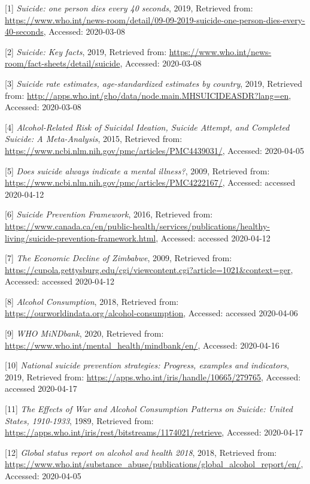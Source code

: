 \documentclass[]{article}
\begin{document}
{[}1{]} \emph{Suicide: one person dies every 40 seconds}, 2019,
Retrieved from:
\url{https://www.who.int/news-room/detail/09-09-2019-suicide-one-person-dies-every-40-seconds},
Accessed: 2020-03-08

{[}2{]} \emph{Suicide: Key facts}, 2019, Retrieved from:
\url{https://www.who.int/news-room/fact-sheets/detail/suicide},
Accessed: 2020-03-08

{[}3{]} \emph{Suicide rate estimates, age-standardized estimates by
country}, 2019, Retrieved from:
\url{http://apps.who.int/gho/data/node.main.MHSUICIDEASDR?lang=en},
Accessed: 2020-03-08

{[}4{]} \emph{Alcohol-Related Risk of Suicidal Ideation, Suicide
Attempt, and Completed Suicide: A Meta-Analysis}, 2015, Retrieved from:
\url{https://www.ncbi.nlm.nih.gov/pmc/articles/PMC4439031/}, Accessed:
2020-04-05

{[}5{]} \emph{Does suicide always indicate a mental illness?}, 2009,
Retrieved from:
\url{https://www.ncbi.nlm.nih.gov/pmc/articles/PMC4222167/}, Accessed:
accessed 2020-04-12

{[}6{]} \emph{Suicide Prevention Framework}, 2016, Retrieved from:
\url{https://www.canada.ca/en/public-health/services/publications/healthy-living/suicide-prevention-framework.html},
Accessed: accessed 2020-04-12

{[}7{]} \emph{The Economic Decline of Zimbabwe}, 2009, Retrieved from:
\url{https://cupola.gettysburg.edu/cgi/viewcontent.cgi?article=1021\&context=ger},
Accessed: accessed 2020-04-12

{[}8{]} \emph{Alcohol Consumption}, 2018, Retrieved from:
\url{https://ourworldindata.org/alcohol-consumption}, Accessed: accessed
2020-04-06

{[}9{]} \emph{WHO MiNDbank}, 2020, Retrieved from:
\url{https://www.who.int/mental_health/mindbank/en/}, Accessed:
2020-04-16

{[}10{]} \emph{National suicide prevention strategies: Progress,
examples and indicators}, 2019, Retrieved from:
\url{https://apps.who.int/iris/handle/10665/279765}, Accessed: accessed
2020-04-17

{[}11{]} \emph{The Effects of War and Alcohol Consumption Patterns on
Suicide: United States, 1910-1933}, 1989, Retrieved from:
\url{https://apps.who.int/iris/rest/bitstreams/1174021/retrieve},
Accessed: 2020-04-17

{[}12{]} \emph{Global status report on alcohol and health 2018}, 2018,
Retrieved from:
\url{https://www.who.int/substance_abuse/publications/global_alcohol_report/en/},
Accessed: 2020-04-05
\end{document}
